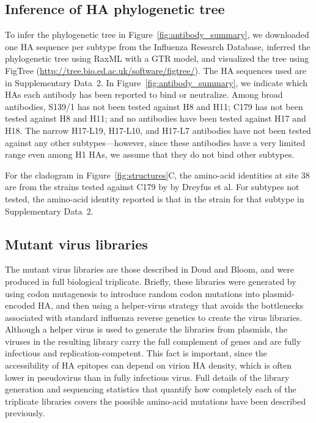 \documentclass[11pt]{article}
\begin{document}
\subsection*{Inference of HA phylogenetic tree}
To infer the phylogenetic tree in Figure~\ref{fig:antibody_summary}, we downloaded one HA sequence per subtype from the Influenza Research Database\cite{zhang2017influenza}, inferred the phylogenetic tree using RaxML\cite{stamatakis2014raxml} with a GTR model, and visualized the tree using FigTree (\url{http://tree.bio.ed.ac.uk/software/figtree/}). 
The HA sequences used are in Supplementary Data~2. 
In Figure~\ref{fig:antibody_summary}, we indicate which HAs each antibody has been reported to bind or neutralize\cite{yoshida2009cross, lee2012heterosubtypic, okuno1993common, dreyfus2013structure, corti2011neutralizing}. 
Among broad antibodies, S139/1 has not been tested against H8 and H11; C179 has not been tested against H8 and H11; and no antibodies have been tested against H17 and H18.
The narrow H17-L19, H17-L10, and H17-L7 antibodies have not been tested against any other subtypes---however, since these antibodies have a very limited range even among H1 HAs\cite{caton1982antigenic}, we assume that they do not bind other subtypes.

For the cladogram in Figure~\ref{fig:structures}C, the amino-acid identities at site 38 are from the strains tested against C179 by by Dreyfus et al\cite{dreyfus2013structure}. 
For subtypes not tested, the amino-acid identity reported is that in the strain for that subtype in Supplementary Data~2.

\subsection*{Mutant virus libraries}
The mutant virus libraries are those described in Doud and Bloom\cite{doud2016accurate}, and were produced in full biological triplicate.
Briefly, these libraries were generated by using codon mutagenesis\cite{bloom2014experimentally} to introduce random codon mutations into plasmid-encoded HA, and then using a helper-virus strategy that avoids the bottlenecks associated with standard influenza reverse genetics to create the virus libraries.
Although a helper virus is used to generate the libraries from plasmids, the viruses in the resulting library carry the full complement of genes and are fully infectious and replication-competent\cite{doud2016accurate}.
This fact is important, since the accessibility of HA epitopes can depend on virion HA density, which is often lower in pseudovirus than in fully infectious virus\cite{corti2011neutralizing,joyce2016vaccine}.
Full details of the library generation and sequencing statistics that quantify how completely each of the triplicate libraries covers the possible amino-acid mutations have been described previously\cite{doud2016accurate}.
\end{document}
